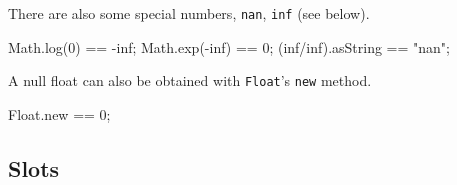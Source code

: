 There are also some special numbers, \lstinline|nan|, \lstinline|inf|
(see below).

\begin{urbiassert}
Math.log(0) == -inf;
Math.exp(-inf) == 0;
(inf/inf).asString == "nan";
\end{urbiassert}

A null float can also be obtained with \lstinline|Float|'s
\lstinline|new| method.

\begin{urbiassert}
Float.new == 0;
\end{urbiassert}

\subsection{Slots}

